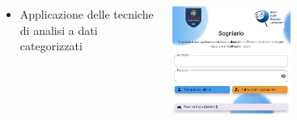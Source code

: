 \begin{minipage}[t]{\textwidth}
    \begin{columns}
        \begin{column}{0.5\textwidth}
        \begin{itemize}
            \item Applicazione delle tecniche di analisi a dati categorizzati
        \end{itemize}
        \end{column}
    \begin{column}{0.5\textwidth}
        \centering
        \includegraphics[width=0.5\textwidth]{immagini/sogniario}
    \end{column}
\end{columns}
\end{minipage}